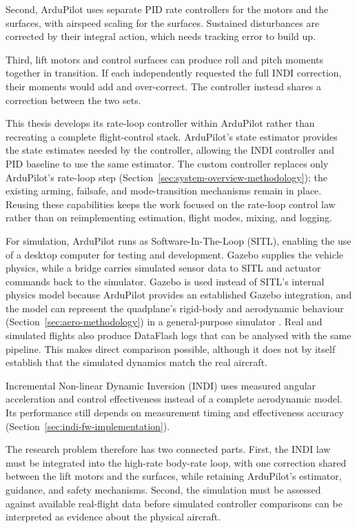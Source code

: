 \documentclass{article}
\begin{document}
Second, ArduPilot uses separate PID rate controllers for the motors and the surfaces, with airspeed scaling for the surfaces. Sustained disturbances are corrected by their integral action, which needs tracking error to build up.

Third, lift motors and control surfaces can produce roll and pitch moments together in transition. If each independently requested the full INDI correction, their moments would add and over-correct. The controller instead shares a correction between the two sets.

This thesis develops its rate-loop controller within ArduPilot rather than recreating a complete flight-control stack. ArduPilot's state estimator provides the state estimates needed by the controller, allowing the INDI controller and PID baseline to use the same estimator. The custom controller replaces only ArduPilot's rate-loop step (Section~\ref{sec:system-overview-methodology}); the existing arming, failsafe, and mode-transition mechanisms remain in place. Reusing these capabilities keeps the work focused on the rate-loop control law rather than on reimplementing estimation, flight modes, mixing, and logging.

For simulation, ArduPilot runs as Software-In-The-Loop (SITL), enabling the use of a desktop computer for testing and development. Gazebo supplies the vehicle physics, while a bridge carries simulated sensor data to SITL and actuator commands back to the simulator. Gazebo is used instead of SITL's internal physics model because ArduPilot provides an established Gazebo integration, and the model can represent the quadplane's rigid-body and aerodynamic behaviour (Section~\ref{sec:aero-methodology}) in a general-purpose simulator \citep{ardupilotdocs,ardupilotgazebo,gazebodocs}. Real and simulated flights also produce DataFlash logs that can be analysed with the same pipeline. This makes direct comparison possible, although it does not by itself establish that the simulated dynamics match the real aircraft.

Incremental Non-linear Dynamic Inversion (INDI) uses measured angular acceleration and control effectiveness instead of a complete aerodynamic model. Its performance still depends on measurement timing and effectiveness accuracy (Section~\ref{sec:indi-fw-implementation}).

The research problem therefore has two connected parts. First, the INDI law must be integrated into the high-rate body-rate loop, with one correction shared between the lift motors and the surfaces, while retaining ArduPilot's estimator, guidance, and safety mechanisms. Second, the simulation must be assessed against available real-flight data before simulated controller comparisons can be interpreted as evidence about the physical aircraft.   
\end{document}
